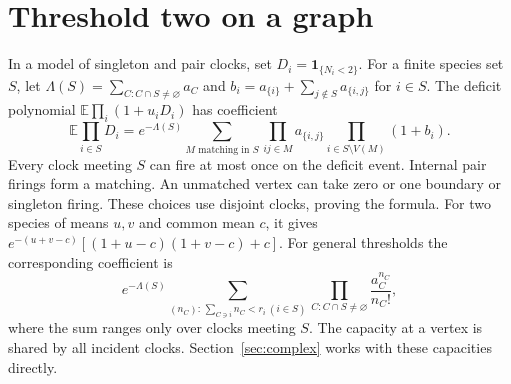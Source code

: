 \documentclass[11pt]{article}
\newcommand{\E}{\mathbb E}
\newcommand{\ind}{\mathbf1}
\numberwithin{equation}{section}
\begin{document}
\section{Threshold two on a graph}
In a model of singleton and pair clocks, set $D_i=\ind_{\{N_i<2\}}$.
For a finite species set $S$, let $\Lambda(S)=\sum_{C:C\cap S\ne\varnothing}a_C$
and $b_i=a_{\{i\}}+\sum_{j\notin S} a_{\{i,j\}}$ for $i\in S$.
The deficit polynomial $\E\prod_i(1+u_iD_i)$ has coefficient
\begin{equation}\label{eq:matching}
 \E\prod_{i\in S}D_i=e^{-\Lambda(S)}
 \sum_{M\text{ matching in }S}\prod_{ij\in M}a_{\{i,j\}}
                    \prod_{i\in S\setminus V(M)}(1+b_i).
\end{equation}
Every clock meeting $S$ can fire at most once on the deficit event. Internal
pair firings form a matching. An unmatched vertex can take zero or one boundary
or singleton firing. These choices use disjoint clocks, proving the formula.
For two species of means $u,v$ and common mean $c$, it gives
$e^{-(u+v-c)}[(1+u-c)(1+v-c)+c]$.
For general thresholds the corresponding coefficient is
\[
 e^{-\Lambda(S)}
 \sum_{(n_C):\,\sum_{C\ni i}n_C<r_i\ (i\in S)}
 \prod_{C:C\cap S\ne\varnothing}\frac{a_C^{n_C}}{n_C!},
\]
where the sum ranges only over clocks meeting $S$. The capacity at a vertex is shared by all
incident clocks. Section~\ref{sec:complex} works with these capacities directly.
\end{document}
